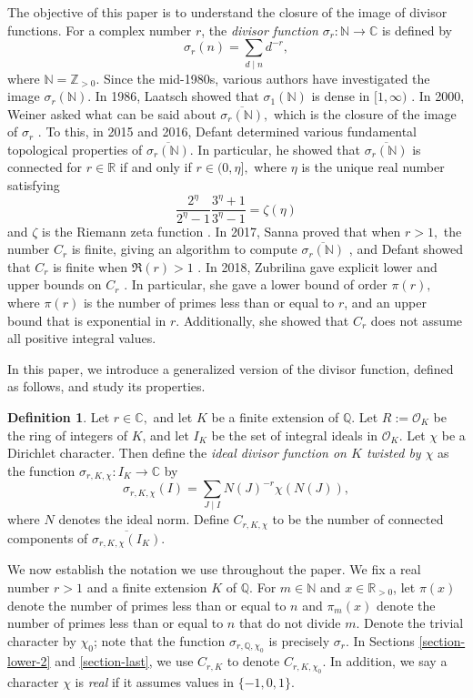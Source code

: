 \documentclass[12pt]{amsart}
\theoremstyle{definition}
\newtheorem{definition}[theorem]{Definition}
\numberwithin{equation}{section}
\newcommand{\C}{\mathbb{C}}
\newcommand{\Q}{\mathbb{Q}}
\newcommand{\Z}{\mathbb{Z}}
\newcommand{\N}{\mathbb{N}}
\newcommand{\R}{\mathbb{R}}
\begin{document}
The objective of this paper is to understand the closure of the image of divisor functions. For a complex number $r$, the \textit{divisor function} $\sigma_r : \N \rightarrow \C$ is defined by $$\sigma_r(n) = \sum_{d \mid n} d^{-r},$$ where $\N = \Z_{> 0}.$ 
Since the mid-1980s, various authors have investigated the image $\sigma_r(\N).$ 
In 1986, Laatsch showed that $\sigma_1(\N)$ is dense in $[1, \infty)$ \cite{L86}. In 2000, Weiner asked what can be said about $\overline{\sigma_r(\N)},$ which is the closure of the image of $\sigma_r$ \cite{W00}. To this, in 2015 and 2016, Defant determined various fundamental topological properties of $\overline{\sigma_r(\N)}.$ In particular, he showed that $\overline{\sigma_r(\N)}$ is connected for $r \in \R$ if and only if $r \in (0, \eta],$ where $\eta$ is the unique real number satisfying $$\frac{2^\eta}{2^\eta - 1} \frac{3^\eta + 1}{3^\eta - 1} = \zeta(\eta)$$ and $\zeta$ is the Riemann zeta function \cite{D15}.
In 2017, Sanna proved that when $r > 1,$ the number $C_r$ is finite, giving an algorithm to compute $\overline{\sigma_r(\N)}$ \cite{S17}, and Defant showed that $C_r$ is finite when $\Re(r) > 1$ \cite{D17}.
In 2018, Zubrilina gave explicit lower and upper bounds on $C_r$ \cite{Z18}. In particular, she gave a lower bound of order $\pi(r),$ where $\pi(r)$ is the number of primes less than or equal to $r$, and an upper bound that is exponential in $r$. Additionally, she showed that $C_r$ does not assume all positive integral values. 


In this paper, we introduce a generalized version of the divisor function, defined as follows, and study its properties.

\begin{definition}
    Let $r \in \C,$ and let $K$ be a finite extension of $\Q$. Let $R := \mathcal{O}_K$ be the ring of integers of $K$, and let $I_K$ be the set of integral ideals in $\mathcal{O}_K$. Let $\chi$ be a Dirichlet character.
    Then define the \textit{ideal divisor function on $K$ twisted by $\chi$} as the function $\sigma_{r,K,\chi} : I_K \rightarrow \C$ by $$\sigma_{r,K,\chi}(I) = \sum_{J \mid I} N(J)^{-r}\chi(N(J)),$$ where $N$ denotes the ideal norm. 
Define $C_{r,K,\chi}$ to be the number of connected components of $\overline{\sigma_{r,K,\chi}(I_K)}.$
\end{definition}


We now establish the notation we use throughout the paper. We fix a real number $r > 1$ and a finite  extension $K$ of $\Q.$ For $m \in \N$ and $x \in \R_{>0}$, let $\pi(x)$ denote the number of primes less than or equal to $n$ and $\pi_m(x)$ denote the number of primes less than or equal to $n$ that do not divide $m$. Denote the trivial character by $\chi_0$; note that the function $\sigma_{r, \Q, \chi_0}$ is precisely $\sigma_r.$ In Sections \ref{section-lower-2} and \ref{section-last}, we use $C_{r,K}$ to denote $C_{r,K,\chi_0}.$ In addition, we say a character $\chi$ is \textit{real} if it assumes values in $\{-1,0,1\}.$
\end{document}
